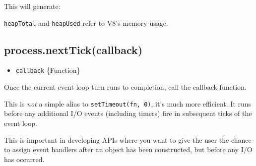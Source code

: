 This will generate:

\begin{Shaded}
\begin{Highlighting}[]
\NormalTok{\{ }\NormalTok{: }\NormalTok{,}
  \NormalTok{: }\NormalTok{,}
  \NormalTok{: } \NormalTok{\}}
\end{Highlighting}
\end{Shaded}

\texttt{heapTotal} and \texttt{heapUsed} refer to V8's memory usage.

\subsection{process.nextTick(callback)}

\begin{itemize}
\item
  \texttt{callback} \{Function\}
\end{itemize}

Once the current event loop turn runs to completion, call the callback
function.

This is \emph{not} a simple alias to \texttt{setTimeout(fn, 0)}, it's
much more efficient. It runs before any additional I/O events (including
timers) fire in subsequent ticks of the event loop.

\begin{Shaded}
\begin{Highlighting}[]
\NormalTok{(}\NormalTok{);}
\NormalTok{(}\NormalTok{() \{}
  \NormalTok{(}\NormalTok{);}
\NormalTok{\});}
\NormalTok{(}\NormalTok{);}
\end{Highlighting}
\end{Shaded}

This is important in developing APIs where you want to give the user the
chance to assign event handlers after an object has been constructed,
but before any I/O has occurred.

